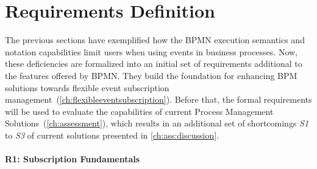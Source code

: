 \section{Requirements Definition}\label{ch:requirements}
The previous sections have exemplified how the BPMN execution semantics and notation capabilities limit users when using events in business processes. 
Now, these deficiencies are formalized into an initial set of requirements additional to the features offered by BPMN.
They build the foundation for enhancing BPM solutions towards flexible event subscription management~(\autoref{ch:flexibleeventsubscription}).
Before that, the formal requirements will be used to evaluate the capabilities of current Process Management Solutions~(\autoref{ch:assessment}), which results in an additional set of shortcomings \textit{S1} to \textit{S3} of current solutions presented in \autoref{ch:ass:discussion}.





\paragraph{R1: Subscription Fundamentals}


